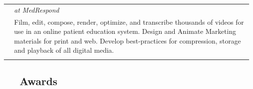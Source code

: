 \documentclass[]{article}
\def\star{{\FA \faStar}}
\begin{document}
\begin{multicols}{2}
\begin{longtable}[c]{@{}ll@{}}
\begin{minipage}[t]{0.20\columnwidth}\raggedright\strut
\strut\end{minipage} &
\begin{minipage}[t]{0.74\columnwidth}\raggedright\strut
\emph{at MedRespond}
\strut\end{minipage}\tabularnewline
\begin{minipage}[t]{0.20\columnwidth}\raggedright\strut
\strut\end{minipage} &
\begin{minipage}[t]{0.74\columnwidth}\raggedright\strut
\color{grey} Film, edit, compose, render, optimize, and transcribe
thousands of videos for use in an online patient education system.
Design and Animate Marketing materials for print and web. Develop
best-practices for compression, storage and playback of all digital
media.
\strut\end{minipage}\tabularnewline
\begin{minipage}[t]{0.20\columnwidth}\raggedright\strut
\strut\end{minipage} &
\begin{minipage}[t]{0.74\columnwidth}\raggedright\strut
\strut\end{minipage}\tabularnewline
\bottomrule
\end{longtable}

\subsection{\texorpdfstring{\color{blue} \star ~~
Awards}{ ~~ Awards}}\label{awards}


\end{multicols}
\end{document}
